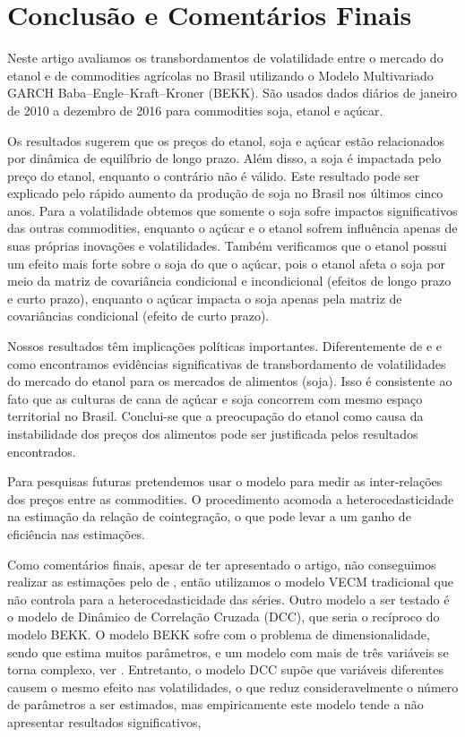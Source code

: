 \section{Conclusão e Comentários Finais}

Neste artigo avaliamos os transbordamentos de volatilidade entre o mercado do etanol e de commodities agrícolas no Brasil utilizando o Modelo Multivariado GARCH Baba–Engle–Kraft–Kroner (BEKK). São usados dados diários de janeiro de 2010 a dezembro de 2016 para commodities soja, etanol e açúcar. 

Os resultados sugerem que os preços do etanol, soja e açúcar estão relacionados por dinâmica de equilíbrio de longo prazo. Além disso, a soja é impactada pelo  preço do etanol, enquanto o contrário não é válido. Este resultado pode ser explicado pelo rápido aumento da produção de soja no Brasil nos últimos cinco anos. Para a volatilidade obtemos que  somente o soja sofre impactos significativos das outras commodities, enquanto o açúcar e o etanol sofrem influência apenas de suas próprias inovações e volatilidades. Também verificamos que  o etanol possui um efeito mais forte sobre o soja do que o açúcar, pois o etanol afeta o soja por meio da matriz de covariância condicional e incondicional (efeitos de longo prazo e curto prazo), enquanto o açúcar impacta o soja apenas pela matriz de covariâncias condicional (efeito de curto prazo).

Nossos resultados têm implicações políticas importantes. Diferentemente de  e  e como  encontramos evidências significativas de transbordamento de volatilidades do mercado do etanol para os mercados de alimentos (soja). Isso é consistente ao fato que as culturas de cana de açúcar e soja concorrem com mesmo espaço territorial no Brasil. Conclui-se que a preocupação do etanol como causa da instabilidade dos preços dos alimentos pode ser justificada pelos resultados encontrados. 

Para pesquisas futuras pretendemos usar o modelo   para medir as inter-relações dos preços entre as commodities. O procedimento  acomoda a heterocedasticidade na estimação da relação de cointegração, o que pode levar  a  um ganho de eficiência nas estimações. 

Como comentários finais, apesar de ter apresentado o artigo, não conseguimos realizar as estimações pelo de , então utilizamos o modelo VECM tradicional que não controla para a heterocedasticidade das séries. Outro modelo  a ser testado é o modelo de Dinâmico de Correlação Cruzada (DCC), que seria o recíproco do modelo BEKK. O modelo BEKK sofre com o problema de dimensionalidade, sendo que estima muitos parâmetros, e um modelo com mais de três variáveis se torna complexo, ver . Entretanto, o modelo DCC supõe que  variáveis diferentes causem o mesmo efeito nas volatilidades, o que reduz consideravelmente o número de parâmetros a ser estimados, mas empiricamente este modelo tende a não apresentar resultados significativos, 